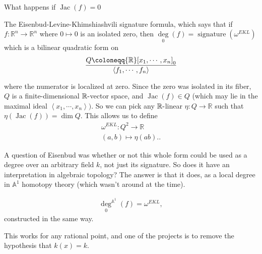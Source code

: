 \begin{question}

What happens if \(\operatorname{Jac}(f) = 0\)

\end{question}

\begin{answer}

The Eisenbud-Levine-Khimshiashvili signature formula, which says that if
\(f: {\mathbb{R}}^n \to {\mathbb{R}}^n\) where \(0\mapsto 0\) is an
isolated zero, then
\(\underset 0 \deg(f) = \operatorname{signature} (\omega^{EKL})\) which
is a bilinear quadratic form on
\begin{align*}
Q \coloneqq{\mathbb{R}}[x_1, \cdots, x_n]_0 \over \left\langle{f_1, \cdots, f_n}\right\rangle
\end{align*}

where the numerator is localized at zero. Since the zero was isolated in
its fiber, \(Q\) is a finite-dimensional
\({\mathbb{R}}{\hbox{-}}\)vector space, and
\(\operatorname{Jac}(f) \in Q\) (which may lie in the maximal ideal
\(\left\langle{x_1, \cdots, x_n}\right\rangle)\). So we can pick any
\({\mathbb{R}}{\hbox{-}}\)linear \(\eta: Q \to {\mathbb{R}}\) such that
\(\eta(\operatorname{Jac}(f)) = \dim Q\). This allows us to define
\begin{align*} \omega^{EKL}: Q^2 \to {\mathbb{R}}\\ (a,b) \mapsto \eta(ab). .\end{align*}

\end{answer}

A question of Eisenbud was whether or not this whole form could be used
as a degree over an arbitrary field \(k\), not just its signature. So
does it have an interpretation in algebraic topology? The answer is that
it does, as a local degree in \({\mathbb{A}}^1\) homotopy theory (which
wasn't around at the time).

\begin{theorem}

\begin{align*}
\underset 0 \deg^{{\mathbb{A}}^1}(f) = \omega^{EKL}
,\end{align*}
constructed in the same way.

\end{theorem}

This works for any rational point, and one of the projects is to remove
the hypothesis that \(k(x) = k\).

